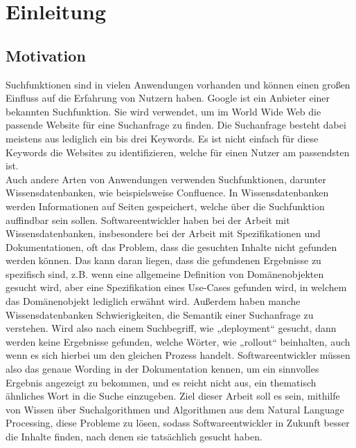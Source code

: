 \chapter{Einleitung}
\label{chap:intro}

\section{Motivation}
Suchfunktionen sind in vielen Anwendungen vorhanden und können einen großen Einfluss auf die Erfahrung von Nutzern haben.
Google ist ein Anbieter einer bekannten Suchfunktion.
Sie wird verwendet, um im World Wide Web die passende Website für eine Suchanfrage zu finden.
Die Suchanfrage besteht dabei meistens aus lediglich ein bis drei Keywords.
Es ist nicht einfach für diese Keywords die Websites zu identifizieren, welche für einen Nutzer am passendsten ist.\\

Auch andere Arten von Anwendungen verwenden Suchfunktionen, darunter Wissensdatenbanken, wie beispielsweise Confluence.
In Wissensdatenbanken werden Informationen auf Seiten gespeichert, welche über die Suchfunktion auffindbar sein sollen.
Softwareentwickler haben bei der Arbeit mit Wissensdatenbanken, insbesondere bei der Arbeit mit Spezifikationen und Dokumentationen, oft das Problem, dass die gesuchten Inhalte nicht gefunden werden können.
Das kann daran liegen, dass die gefundenen Ergebnisse zu spezifisch sind, z.B. wenn eine allgemeine Definition von Domänenobjekten gesucht wird, aber eine Spezifikation eines Use-Cases gefunden wird, in welchem das Domänenobjekt lediglich erwähnt wird.
Außerdem haben manche Wissensdatenbanken Schwierigkeiten, die Semantik einer Suchanfrage zu verstehen.
Wird also nach einem Suchbegriff, wie „deployment“ gesucht, dann werden keine Ergebnisse gefunden, welche Wörter, wie „rollout“ beinhalten, auch wenn es sich hierbei um den gleichen Prozess handelt.
Softwareentwickler müssen also das genaue Wording in der Dokumentation kennen, um ein sinnvolles Ergebnis angezeigt zu bekommen, und es reicht nicht aus, ein thematisch ähnliches Wort in die Suche einzugeben.
Ziel dieser Arbeit soll es sein, mithilfe von Wissen über Suchalgorithmen und Algorithmen aus dem Natural Language Processing, diese Probleme zu lösen, sodass Softwareentwickler in Zukunft besser die Inhalte finden, nach denen sie tatsächlich gesucht haben.

